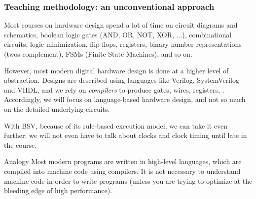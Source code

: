 \begin{frame}
\frametitle{Teaching methodology: an unconventional approach}

Most courses on hardware design spend a lot of time on
circuit diagrams and schematics, boolean logic gates (AND, OR, NOT,
XOR, ...), combinational circuits, logic minimization, flip flops,
registers, binary number representations (twos complement), FSMs
(Finite State Machines), and so on.

\vspace{1ex}

However, most modern digital hardware design is done at a higher level
of abstraction.  Designs are described using languages like Verilog,
SystemVerilog and VHDL, and we rely on \emph{compilers} to produce
gates, wires, registers, {\etc}.  Accordingly, we will focus on
language-based hardware design, and not so much on the detailed
underlying circuits.

\vspace{1ex}

With BSV, because of its rule-based execution model, we can take it
even further; we will not even have to talk about clocks and clock
timing until late in the course.

\vspace*{5ex}

\footnotesize

\begin{block}{Analogy}
Most modern programs are written in high-level languages, which are
compiled into machine code using compilers.  It is not necessary to
understand machine code in order to write programs (unless you are
trying to optimize at the bleeding edge of high performance).

\end{block}

\end{frame}


